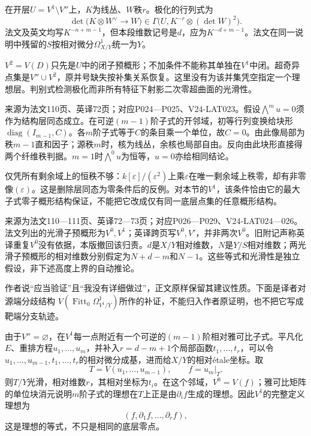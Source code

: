 在开层$U=V^1\setminus V''$上，$K$为线丛、$W$秩$r$。极化的行列式为
\[
\det\bigl(K\otimes W^\vee\to W\bigr)
\in\Gamma\bigl(U,K^{-r}\otimes(\det W)^2\bigr).
\]
法文及英文均写$K^{-n+m-1}$，但本段维数记号是$d$，应为$K^{-d+m-1}$。法文在同一说明中残留的$S$按相对微分$\Omega^1_{X/Y}$统一为$Y$。

$V^2=V(D)$只先是$U$中的闭子预概形；不加条件不能称其单独在$V^1$中闭。超奇异点集是$V''\cup V^2$，原并号缺失按补集关系恢复。这里没有为该并集凭空指定一个理想层。判别式检测极化而非所有特征下射影二次零超曲面的光滑性。

来源为法文110页、英译72页；对应P024—P025、V24-LAT023。假设$\bigwedge^m u=0$须作为结构层同态成立。在可逆$(m-1)$阶子式的开邻域，初等行列变换给块形$\operatorname{diag}(I_{m-1},C)$。各$m$阶子式等于$C$的条目乘一个单位，故$C=0$。由此像局部为秩$m-1$直和因子；源秩$m$时，核为线丛，余核也局部自由。反向由此块形直接得两个纤维秩判据。$m=1$时$\bigwedge^0u$为恒等，$u=0$亦给相同结论。

仅凭所有剩余域上的恒秩不够：$k[\varepsilon]/(\varepsilon^2)$上乘$\varepsilon$在唯一剩余域上秩零，却有非零像$(\varepsilon)$。这是删除层同态为零条件后的反例。对本节的$V^1$，该条件恰由它的最大子式零子概形结构保证，不能把它改成仅有同一底层点集的任意概形结构。

来源为法文110—111页、英译72—73页；对应P026—P029、V24-LAT024—026。法文列出的光滑子预概形为$V^0,V^1$；英译跨页写$V^0,V'$，并非两次$V^0$。旧附记声称英译重复$V^0$没有依据，本版撤回该归责。$d$是$X/Y$相对维数，$N$是$Y/S$相对维数；两光滑子预概形的相对维数分别假定为$N+d-m$和$N-1$。这些等式和光滑性是独立假设，非下述高度上界的自动推论。

作者说“应当验证”且“我没有详细做过”，正文原样保留其建议性质。下面是译者对源端分歧结构
$V(\operatorname{Fitt}_0\Omega^1_{V^1/Y})$所作的补证，不能归入作者原证明，也不把它写成靶端分支轨迹。

由于$V''=\varnothing$，在$V^1$每一点附近有一个可逆的$(m-1)$阶相对雅可比子式。平凡化$E$、重排方程$u_1,\ldots,u_m$，并补入$r=d-m+1$个局部函数$t_1,\ldots,t_r$，可以令$u_1,\ldots,u_{m-1},t_1,\ldots,t_r$的相对微分成基，进而给$X/Y$的相对étale坐标。取
\[
T=V(u_1,\ldots,u_{m-1}),\qquad f=u_m|_T.
\]
则$T/Y$光滑，相对维数$r$，其相对坐标为$t_i$。在这个邻域，$V^0=V(f)$；雅可比矩阵的单位块消元说明$m$阶子式的理想在$T$上正是由$\partial_i f$生成的理想。因此$V^1$的完整定义理想为
\[
(f,\partial_1f,\ldots,\partial_rf),
\]
这是理想的等式，不只是相同的底层零点。

